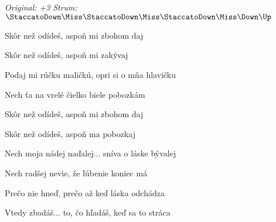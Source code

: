 \begin{song}


\begin{headerbox}
\textit{Original: +3} \quad
\textit{Strum:} $\StaccatoDown\Miss\StaccatoDown\Miss\StaccatoDown\Miss\Down\Up$
\end{headerbox}

\begin{hchordbox}
\end{hchordbox}

\Large




\bigskip

Skôr než odídeš,  aspoň mi zbohom daj  \par
Skôr než odídeš, aspoň mi zakývaj \par
Podaj mi rúčku maličkú, opri si o mňa hlavičku \par
Nech ťa na vrelé čielko biele pobozkám \par

\bigskip

Skôr než odídeš,  aspoň mi zbohom daj  \par
Skôr než odídeš, aspoň ma pobozkaj \par
Nech moja nádej naďalej... sníva o láske bývalej \par
Nech radšej nevie, že ľúbenie koniec má \par

\bigskip

Prečo nie hneď, prečo až keď láska odchádza \par
{}Vtedy zbadáš... to, čo hľadáš, keď sa to stráca \par


\end{song}
